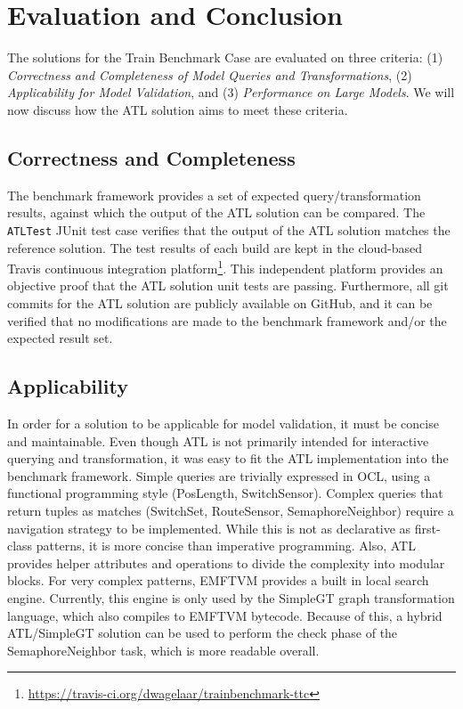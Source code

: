 \documentclass[submission,copyright,creativecommons]{eptcs}
\begin{document}
\section{Evaluation and Conclusion}
\label{sec:eval}

The solutions for the Train Benchmark Case are evaluated on three criteria: (1) \emph{Correctness and Completeness of Model Queries and Transformations}, (2) \emph{Applicability for Model Validation}, and (3) \emph{Performance on Large Models}. We will now discuss how the ATL solution aims to meet these criteria.

\subsection{Correctness and Completeness}

The benchmark framework provides a set of expected query/transformation results, against which the output of the ATL solution can be compared. The \texttt{ATLTest} JUnit test case verifies that the output of the ATL solution matches the reference solution. The test results of each build are kept in the cloud-based Travis continuous integration platform\footnote{\url{https://travis-ci.org/dwagelaar/trainbenchmark-ttc}}. This independent platform provides an objective proof that the ATL solution unit tests are passing. Furthermore, all git commits for the ATL solution are publicly available on GitHub, and it can be verified that no modifications are made to the benchmark framework and/or the expected result set.

\subsection{Applicability}

In order for a solution to be applicable for model validation, it must be concise and maintainable. Even though ATL is not primarily intended for interactive querying and transformation, it was easy to fit the ATL implementation into the benchmark framework. Simple queries are trivially expressed in OCL, using a functional programming style (PosLength, SwitchSensor). Complex queries that return tuples as matches (SwitchSet, RouteSensor, SemaphoreNeighbor) require a navigation strategy to be implemented. While this is not as declarative as first-class patterns, it is more concise than imperative programming. Also, ATL provides helper attributes and operations to divide the complexity into modular blocks. For very complex patterns, EMFTVM provides a built in local search engine. Currently, this engine is only used by the SimpleGT graph transformation language, which also compiles to EMFTVM bytecode. Because of this, a hybrid ATL/SimpleGT solution can be used to perform the check phase of the SemaphoreNeighbor task, which is more readable overall.
\end{document}
